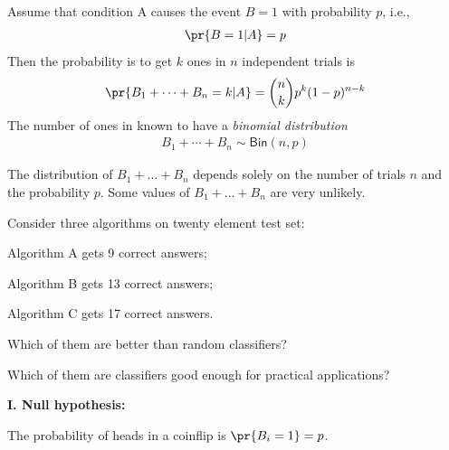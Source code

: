 \documentclass[landscape,footrule]{foils}
\begin{document}

Assume that condition A causes the event $B=1$ with probability $p$, i.e.,
\begin{align*}
\pr{B=1|A}=p
\end{align*}
Then the probability is to get $k$ ones in $n$ independent trials is
\begin{align*}
\pr{B_1+\cdots+B_n=k|A}=\binom{n}{k}p^k(1-p)^{n-k}
\end{align*} 
The number of ones in known to have a \emph{binomial distribution}
\begin{align*}
 B_1+\cdots+B_n\sim\mathsf{Bin}(n, p)
\end{align*}


\vspace*{-1cm}

The distribution of  $B_1+\ldots+B_n$ depends solely on the number of trials $n$ and the probability $p$. Some values of $B_1+\ldots+B_n$ are very unlikely.



Consider three algorithms on twenty element test set:
\begin{diamonds}
\item Algorithm A gets 9 correct answers;
\item Algorithm B gets 13 correct answers;
\item Algorithm C gets 17 correct answers.
\end{diamonds}
\vspace*{3ex}
\begin{triangles}
\item Which of them are better than random classifiers?
\item Which of them are classifiers good enough for practical applications?
\end{triangles}



\textbf{I. Null hypothesis:}
\begin{triangles}
\item The probability of heads in a coinflip is $\pr{B_i=1}=p$.
\end{triangles}
\vspace*{1cm}
\end{document}
